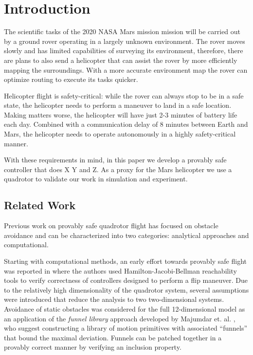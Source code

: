 \documentclass[conference]{IEEEtran}
\begin{document}
\section{Introduction} \label{subsec:intro}

The scientific tasks of the 2020 NASA Mars mission mission will be carried out by a ground rover operating in a largely unknown environment. The rover moves slowly and has limited capabilities of surveying its environment, therefore, there are plans to also send a helicopter that can assist the rover by more efficiently mapping the surroundings. With a more accurate environment map the rover can optimize routing to execute its tasks quicker.

Helicopter flight is safety-critical: while the rover can always stop to be in a safe state, the helicopter needs to perform a maneuver to land in a safe location. Making matters worse, the helicopter will have just 2-3 minutes of battery life each day. Combined with a communication delay of 8 minutes between Earth and Mars, the helicopter needs to operate autonomously in a highly safety-critical manner.

With these requirements in mind, in this paper we develop a provably safe controller that does X Y and Z. As a proxy for the Mars helicopter we use a quadrotor to validate our work in simulation and experiment.   


\subsection{Related Work}

Previous work on provably safe quadrotor flight has focused on obstacle avoidance and can be characterized into two categories: analytical approaches and computational.

Starting with computational methods, an early effort towards provably safe flight was reported in \cite{Gillula2010} where the authors used Hamilton-Jacobi-Bellman reachability tools to verify correctness of controllers designed to perform a flip maneuver. Due to the relatively high dimensionality of the quadrotor system, several assumptions were introduced that reduce the analysis to two two-dimensional systems. Avoidance of static obstacles was considered for the full 12-dimensional model as an application of the \emph{funnel library} approach developed by Majumdar et. al. \cite{Majumdar2017}, who suggest constructing a library of motion primitives with associated ``funnels'' that bound the maximal deviation. Funnels can be patched together in a provably correct manner by verifying an inclusion property.
\end{document}
